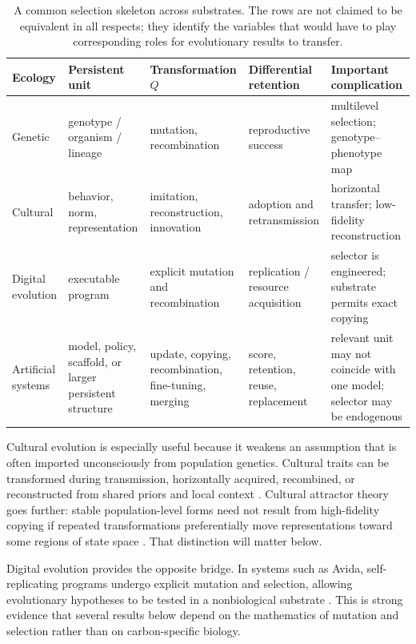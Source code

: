 \documentclass[11pt]{article}
\begin{document}
\begin{table}[t]
\centering
\small
\caption{A common selection skeleton across substrates. The rows are not claimed to be equivalent in all respects; they identify the variables that would have to play corresponding roles for evolutionary results to transfer.}
\label{tab:ecologies}
\begin{tabular}{p{2.0cm}p{2.7cm}p{3.0cm}p{3.0cm}p{3.2cm}}
\toprule
Ecology & Persistent unit & Transformation $Q$ & Differential retention & Important complication \\
\midrule
Genetic & genotype / organism / lineage & mutation, recombination & reproductive success & multilevel selection; genotype--phenotype map \\
Cultural & behavior, norm, representation & imitation, reconstruction, innovation & adoption and retransmission & horizontal transfer; low-fidelity reconstruction \\
Digital evolution & executable program & explicit mutation and recombination & replication / resource acquisition & selector is engineered; substrate permits exact copying \\
Artificial systems & model, policy, scaffold, or larger persistent structure & update, copying, recombination, fine-tuning, merging & score, retention, reuse, replacement & relevant unit may not coincide with one model; selector may be endogenous \\
\bottomrule
\end{tabular}
\end{table}

Cultural evolution is especially useful because it weakens an assumption that is often imported unconsciously from population genetics. Cultural traits can be transformed during transmission, horizontally acquired, recombined, or reconstructed from shared priors and local context \parencite{creanza2017}. Cultural attractor theory goes further: stable population-level forms need not result from high-fidelity copying if repeated transformations preferentially move representations toward some regions of state space \parencite{buskell2017}. That distinction will matter below.

Digital evolution provides the opposite bridge. In systems such as Avida, self-replicating programs undergo explicit mutation and selection, allowing evolutionary hypotheses to be tested in a nonbiological substrate \parencite{wilke2001,zaman2014}. This is strong evidence that several results below depend on the mathematics of mutation and selection rather than on carbon-specific biology.
\end{document}
